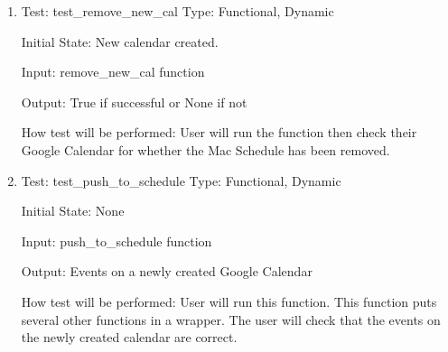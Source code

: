 \documentclass[12pt, titlepage]{article}
\begin{document}
\begin{enumerate}
\color{blue}\item{Test: test\_remove\_new_cal}
Type: Functional, Dynamic
					
Initial State: New calendar created.
					
Input: remove\_new\_cal function
					
Output: True if successful or None if not
					
How test will be performed: User will run the function then check their Google Calendar for whether the Mac Schedule has been removed. 

\color{blue}\item{Test: test\_push\_to\_schedule}
Type: Functional, Dynamic
					
Initial State: None
					
Input: push\_to\_schedule function
					
Output: Events on a newly created Google Calendar
					
How test will be performed: User will run this function. This function puts several other functions in a wrapper. The user will check that the events on the newly created calendar are correct. 
\color{black}

\end{enumerate}
\color{blue}
\end{document}
